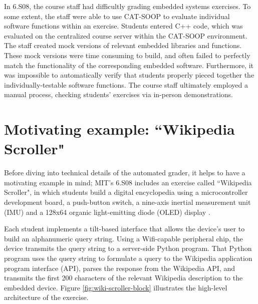 \documentclass[12pt]{article}
\begin{document}
In 6.S08, the course staff had difficultly grading embedded systems exercises.  To some extent, the staff were able to use CAT-SOOP \cite{catsoop} to evaluate individual software functions within an exercise.  Students entered C++ code, which was evaluated on the centralized course server within the CAT-SOOP environment.  The staff created mock versions of relevant embedded libraries and functions.  These mock versions were time consuming to build, and often failed to perfectly match the functionality of the corresponding embedded software.  Furthermore, it was impossible to automatically verify that students properly pieced together the individually-testable software functions.  The course staff ultimately employed a manual process, checking students' exercises via in-person demonstrations.

\clearpage
\section{Motivating example: ``Wikipedia Scroller"}
\label{sec:wiki-scroller}
Before diving into technical details of the automated grader, it helps to have a motivating example in mind;  MIT's 6.S08 includes an exercise called ``Wikipedia Scroller", in which students build a digital encyclopedia using a microcontroller development board, a push-button switch, a nine-axis inertial measurement unit (IMU) and a 128x64 organic light-emitting diode (OLED) display \cite{wiki-scroller}.

Each student implements a tilt-based interface that allows the device's user to build an alphanumeric query string.  Using a Wifi-capable peripheral chip, the device transmits the query string to a server-side Python program.  That Python program uses the query string to formulate a query to the Wikipedia application program interface (API), parses the response from the Wikipedia API, and transmits the first 200 characters of the relevant Wikipedia description to the embedded device.  Figure \ref{fig:wiki-scroller-block} illustrates the high-level architecture of the exercise.
\end{document}
